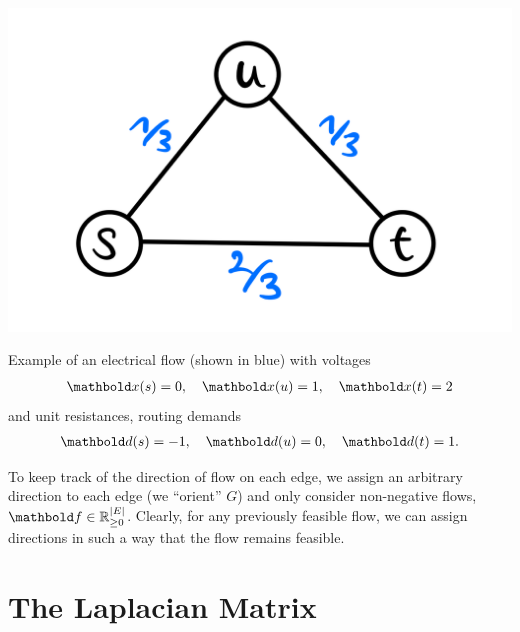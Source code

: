 \begin{marginfigure}
    \includegraphics[width=\textwidth]{notes/figures/electrical_flows.png}
    \caption{Example of an electrical flow (shown in blue) with voltages \begin{align*}
        \vx(s) = 0,\quad \vx(u) = 1,\quad \vx(t) = 2
    \end{align*} and unit resistances, routing demands \begin{align*}
        \vd(s) = -1,\quad \vd(u) = 0,\quad \vd(t) = 1.
    \end{align*}}
\end{marginfigure}

To keep track of the direction of flow on each edge, we assign an arbitrary direction to each edge (we ``orient'' $G$) and only consider non-negative flows, $\vf \in \R_{\geq 0}^{|\sE|}$. Clearly, for any previously feasible flow, we can assign directions in such a way that the flow remains feasible.

\section{The Laplacian Matrix}


